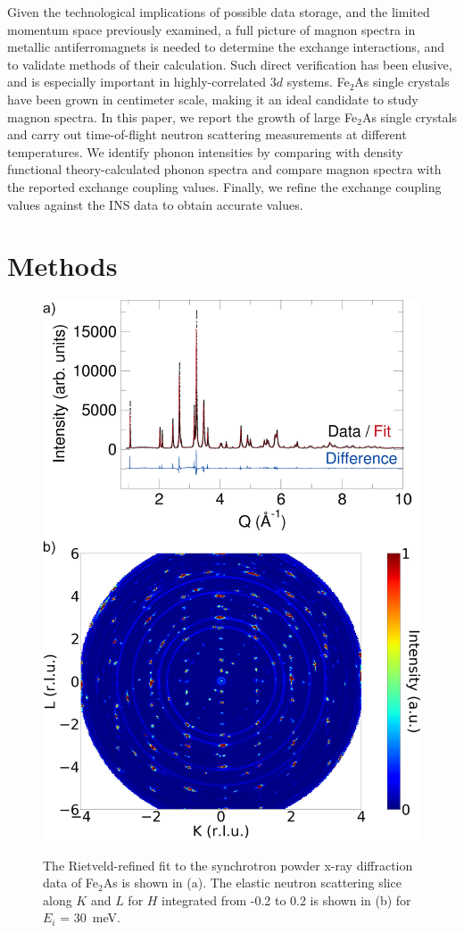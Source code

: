 \documentclass[10pt,doublespacing,edeposit]{uiucthesis2020}
\begin{document}
\begin{mainmatter}
Given the technological implications of possible data storage, and the limited momentum space previously examined, a full picture of magnon spectra in metallic antiferromagnets is needed to determine the exchange interactions, and to validate methods of their calculation. Such direct verification has been elusive, and is especially important in highly-correlated 3$d$ systems.
Fe$_2$As single crystals have been grown in centimeter scale,\cite{Katsuraki1966}  making it an ideal candidate to study magnon spectra. In this paper, we report the growth of large Fe$_2$As single crystals and carry out time-of-flight neutron scattering measurements at different temperatures. We identify phonon intensities by comparing with density functional theory-calculated phonon spectra and compare magnon spectra with the reported exchange coupling values. Finally, we refine the exchange coupling values against the INS data to obtain accurate values.


\section{Methods}

\begin{figure}
\centering\includegraphics[width=0.65\columnwidth]{figures/ch8/11BM_refinement_elastic_slice.png} \\
\caption{\label{fig:photo_11_BM}
The Rietveld-refined fit to the synchrotron powder x-ray diffraction data of Fe$_2$As is shown in (a). 
The elastic neutron scattering slice along $K$ and $L$ for $H$ integrated from -0.2 to 0.2 is shown in (b) for $E_i$ = 30~meV. 
}


\end{figure}
\end{mainmatter}
\end{document}
